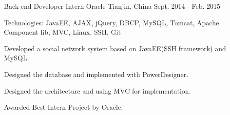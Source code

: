 \begin{cventries}
  \cventry
    {Back-end Developer Intern}
    {Oracle}
    {Tianjin, China}
    {Sept. 2014 - Feb. 2015}
    {
      \begin{cvitems}
        \item {Technologies: JavaEE, AJAX, jQuery, DBCP, MySQL, Tomcat, Apache Component lib, MVC, Linux, SSH, Git}
        \item {Developed a social network system based on JavaEE(SSH framework) and MySQL.}
        \item {Designed the database and implemented with PowerDesigner.}
        \item {Designed the architecture and using MVC for implementation.}
        \item {Awarded Best Intern Project by Oracle.}
      \end{cvitems} 
    }
\end{cventries}
